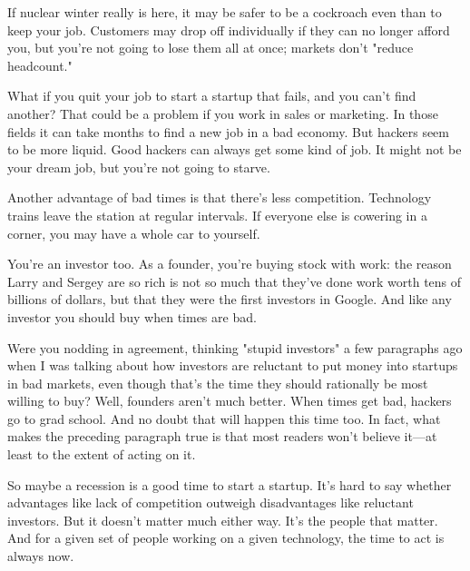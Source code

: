 If nuclear winter really is here, it may
                    be safer to be a cockroach even than to keep your job.
                    Customers may drop off individually if they can no longer
                    afford you, but you're not going to lose them all at once;
                    markets don't "reduce headcount."

What if you
                    quit your job to start a startup that fails, and you can't
                    find another? That could be a problem if you work in sales
                    or marketing. In those fields it can take months to find a
                    new job in a bad economy. But hackers seem to be more
                    liquid. Good hackers can always get some kind of job. It
                    might not be your dream job, but you're not going to
                    starve.

Another advantage of bad times is that
                    there's less competition. Technology trains leave the
                    station at regular intervals. If everyone else is cowering
                    in a corner, you may have a whole car to yourself.

You're
                    an investor too. As a founder, you're buying stock with
                    work: the reason Larry and Sergey are so rich is not so much
                    that they've done work worth tens of billions of dollars,
                    but that they were the first investors in Google. And like
                    any investor you should buy when times are bad.

Were
                    you nodding in agreement, thinking "stupid investors" a few
                    paragraphs ago when I was talking about how investors are
                    reluctant to put money into startups in bad markets, even
                    though that's the time they should rationally be most
                    willing to buy? Well, founders aren't much better. When
                    times get bad, hackers go to grad school. And no doubt that
                    will happen this time too. In fact, what makes the preceding
                    paragraph true is that most readers won't believe
                    it---at least to the extent of acting on it.

So
                    maybe a recession is a good time to start a startup. It's
                    hard to say whether advantages like lack of competition
                    outweigh disadvantages like reluctant investors. But it
                    doesn't matter much either way. It's the people that matter.
                    And for a given set of people working on a given technology,
                    the time to act is always now.



              
            
          
